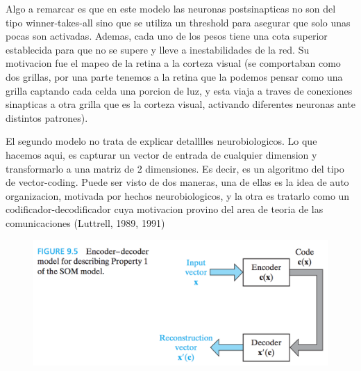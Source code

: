 Algo a remarcar es que en este modelo las neuronas postsinapticas no son del tipo winner-takes-all sino que se utiliza un threshold para asegurar que solo unas pocas son activadas. Ademas, cada uno de los pesos tiene una cota superior establecida para que no se supere y lleve a inestabilidades de la red. Su motivacion fue el mapeo de la retina a la corteza visual (se comportaban como dos grillas, por una parte tenemos a la retina que la podemos pensar como una grilla captando cada celda una porcion de luz, y esta viaja a traves de conexiones sinapticas a otra grilla que es la corteza visual, activando diferentes neuronas ante distintos patrones).



El segundo modelo no trata de explicar detalllles neurobiologicos. Lo que hacemos aqui, es capturar un vector de entrada de cualquier dimension y transformarlo a una matriz de 2 dimensiones. Es decir, es un algoritmo del tipo de vector-coding. Puede ser visto de dos maneras, una de ellas es la idea de auto organizacion, motivada por hechos neurobiologicos, y la otra es tratarlo como un codificador-decodificador cuya motivacion provino del area de teoria de las comunicaciones (Luttrell, 1989, 1991)

\begin{figure}[h!]
  \centering
  \includegraphics[width=.6\linewidth]{img/som/compresion}
\label{fig:test}
\end{figure}